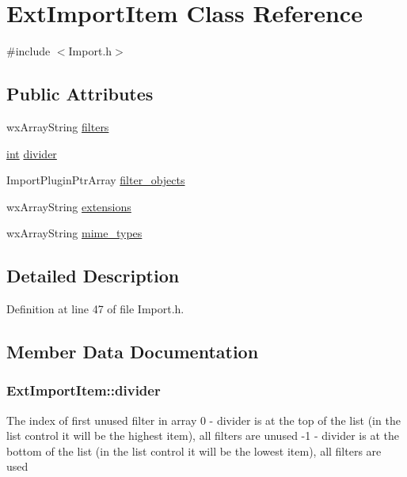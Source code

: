 \hypertarget{class_ext_import_item}{}\section{Ext\+Import\+Item Class Reference}
\label{class_ext_import_item}


{\ttfamily \#include $<$Import.\+h$>$}

\subsection*{Public Attributes}
\begin{DoxyCompactItemize}
\item 
wx\+Array\+String \hyperlink{class_ext_import_item_a15fca71418912718ea7073cff0aa8d00}{filters}
\item 
\hyperlink{xmltok_8h_a5a0d4a5641ce434f1d23533f2b2e6653}{int} \hyperlink{class_ext_import_item_a2f548a8472b4db998102373fe018bfc0}{divider}
\item 
Import\+Plugin\+Ptr\+Array \hyperlink{class_ext_import_item_a2bbd78eb3a5159fca03d7e1eeda638a8}{filter\+\_\+objects}
\item 
wx\+Array\+String \hyperlink{class_ext_import_item_a37b6ef945bf38279d156096de2745900}{extensions}
\item 
wx\+Array\+String \hyperlink{class_ext_import_item_a4df49043980dda3886b6e2e7ff3ddf32}{mime\+\_\+types}
\end{DoxyCompactItemize}


\subsection{Detailed Description}


Definition at line 47 of file Import.\+h.



\subsection{Member Data Documentation}
\subsubsection[{\texorpdfstring{divider}{divider}}]{ Ext\+Import\+Item\+::divider}\hypertarget{class_ext_import_item_a2f548a8472b4db998102373fe018bfc0}{}\label{class_ext_import_item_a2f548a8472b4db998102373fe018bfc0}
The index of first unused filter in  array 0 -\/ divider is at the top of the list (in the list control it will be the highest item), all filters are unused -\/1 -\/ divider is at the bottom of the list (in the list control it will be the lowest item), all filters are used 

